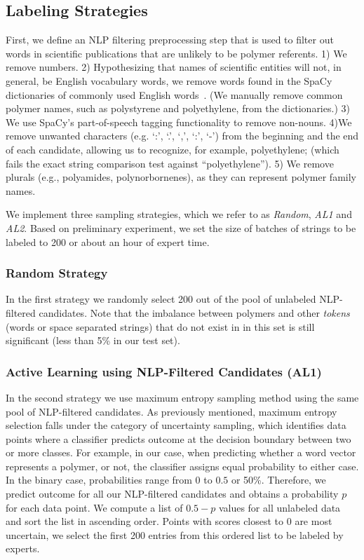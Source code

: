 \subsection{Labeling Strategies}
First, we define an
NLP filtering preprocessing step that is used to filter out
words in scientific publications that are unlikely to be polymer referents. 1) We remove numbers. 2)
Hypothesizing that names of scientific entities will not, in general, be English
vocabulary words, we remove words found in the SpaCy dictionaries
of commonly used English words~\cite{choi2015depends}. (We manually remove common polymer
names, such as polystyrene and polyethylene, from the dictionaries.) 3) We use
SpaCy's part-of-speech tagging functionality to remove non-nouns. 4)We remove
unwanted characters (e.g. `:', `.', `,', `:', `-') from the beginning and the end of each
candidate, allowing us to recognize, for example, polyethylene; (which fails the
exact string comparison test against ``polyethylene''). 5) We remove plurals (e.g.,
polyamides, polynorbornenes), as they can represent polymer family names.

We implement three sampling strategies, which we refer to as \textit{Random}, \textit{AL1} and \textit{AL2}.
Based on preliminary experiment, we set the size of batches of strings to be labeled to 200 or about an hour of expert time.\\

\subsubsection{Random Strategy}
In the first strategy we randomly select 200 out of the pool of unlabeled NLP-filtered candidates. Note that the imbalance between polymers and other \textit{tokens} (words or space separated strings) that do not exist in in this set is still significant (less than 5\% in our test set). \\

\subsubsection{Active Learning using NLP-Filtered Candidates (AL1)}
In the second strategy we use maximum entropy sampling method using the same pool of NLP-filtered candidates.
As previously mentioned, maximum entropy selection falls under the category of uncertainty sampling, which identifies data points where a classifier predicts outcome at the decision boundary between two or more classes. 
For example, in our case, when predicting whether a word vector represents a polymer, or not, the classifier assigns equal probability to either case.
In the binary case, probabilities range from $0$ to $0.5$ or 50\%. Therefore, we predict outcome for all our NLP-filtered candidates and obtains a probability $p$ for each data point. We compute a list of $0.5-p$ values for all unlabeled data and sort the list in ascending order.
Points with scores closest to $0$ are most uncertain, we select the first 200 entries from this ordered list to be labeled by experts. \\



